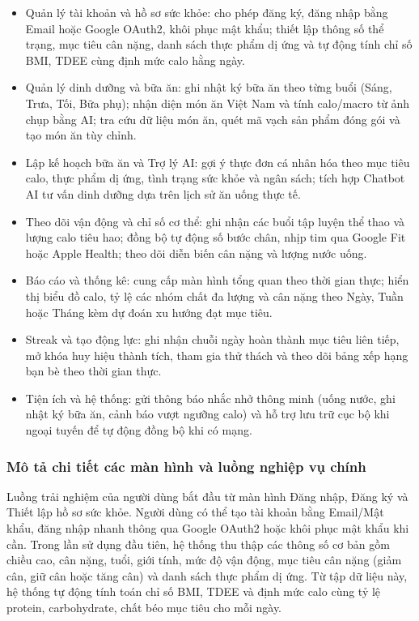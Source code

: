 \documentclass[../main.tex]{subfiles}
\begin{document}
\begin{itemize}
    \item Quản lý tài khoản và hồ sơ sức khỏe: cho phép đăng ký, đăng nhập bằng Email hoặc Google OAuth2, khôi phục mật khẩu; thiết lập thông số thể trạng, mục tiêu cân nặng, danh sách thực phẩm dị ứng và tự động tính chỉ số BMI, TDEE cùng định mức calo hằng ngày.
    \item Quản lý dinh dưỡng và bữa ăn: ghi nhật ký bữa ăn theo từng buổi (Sáng, Trưa, Tối, Bữa phụ); nhận diện món ăn Việt Nam và tính calo/macro từ ảnh chụp bằng AI; tra cứu dữ liệu món ăn, quét mã vạch sản phẩm đóng gói và tạo món ăn tùy chỉnh.
    \item Lập kế hoạch bữa ăn và Trợ lý AI: gợi ý thực đơn cá nhân hóa theo mục tiêu calo, thực phẩm dị ứng, tình trạng sức khỏe và ngân sách; tích hợp Chatbot AI tư vấn dinh dưỡng dựa trên lịch sử ăn uống thực tế.
    \item Theo dõi vận động và chỉ số cơ thể: ghi nhận các buổi tập luyện thể thao và lượng calo tiêu hao; đồng bộ tự động số bước chân, nhịp tim qua Google Fit hoặc Apple Health; theo dõi diễn biến cân nặng và lượng nước uống.
    \item Báo cáo và thống kê: cung cấp màn hình tổng quan theo thời gian thực; hiển thị biểu đồ calo, tỷ lệ các nhóm chất đa lượng và cân nặng theo Ngày, Tuần hoặc Tháng kèm dự đoán xu hướng đạt mục tiêu.
    \item Streak và tạo động lực: ghi nhận chuỗi ngày hoàn thành mục tiêu liên tiếp, mở khóa huy hiệu thành tích, tham gia thử thách và theo dõi bảng xếp hạng bạn bè theo thời gian thực.
    \item Tiện ích và hệ thống: gửi thông báo nhắc nhở thông minh (uống nước, ghi nhật ký bữa ăn, cảnh báo vượt ngưỡng calo) và hỗ trợ lưu trữ cục bộ khi ngoại tuyến để tự động đồng bộ khi có mạng.
\end{itemize}

\subsubsection{Mô tả chi tiết các màn hình và luồng nghiệp vụ chính}

Luồng trải nghiệm của người dùng bắt đầu từ màn hình Đăng nhập, Đăng ký và Thiết lập hồ sơ sức khỏe. Người dùng có thể tạo tài khoản bằng Email/Mật khẩu, đăng nhập nhanh thông qua Google OAuth2 hoặc khôi phục mật khẩu khi cần. Trong lần sử dụng đầu tiên, hệ thống thu thập các thông số cơ bản gồm chiều cao, cân nặng, tuổi, giới tính, mức độ vận động, mục tiêu cân nặng (giảm cân, giữ cân hoặc tăng cân) và danh sách thực phẩm dị ứng. Từ tập dữ liệu này, hệ thống tự động tính toán chỉ số BMI, TDEE và định mức calo cùng tỷ lệ protein, carbohydrate, chất béo mục tiêu cho mỗi ngày.
\end{document}
